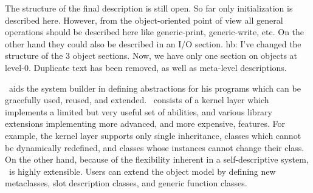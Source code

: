%
\label{obj-0}
\label{telos0}
\gdef\module{telos0}
%
\begin{optPrivate}
    The structure of the final description is still open.  So far only
    initialization is described here. However, from the object-oriented point of
    view all general operations should be described here like generic-print,
    generic-write, etc. On the other hand they could also be described in an I/O
    section.  hb: I've changed the structure of the 3 object sections. Now, we
    have only one section on objects at level-0. Duplicate text has been
    removed, as well as meta-level descriptions.
\end{optPrivate}
%
\begin{optRationale}
    \telos\ aids the system builder in defining abstractions for his programs
    which can be gracefully used, reused, and extended.  \telos\ consists of a
    kernel layer which implements a limited but very useful set of abilities,
    and various library extensions implementing more advanced, and more
    expensive, features.  For example, the kernel layer supports only single
    inheritance, classes which cannot be dynamically redefined, and classes
    whose instances cannot change their class.  On the other hand, because of
    the flexibility inherent in a self-descriptive system, \telos\ is highly
    extensible.  Users can extend the object model by defining new metaclasses,
    slot description classes, and generic function classes.
\end{optRationale}
%
